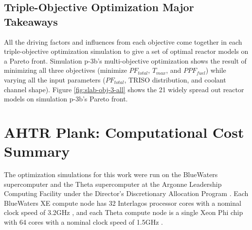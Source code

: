 \subsection{Triple-Objective Optimization Major Takeaways}
All the driving factors and influences from each objective come together in 
each triple-objective optimization simulation to give a set of optimal reactor models 
on a Pareto front. 
Simulation p-3b's multi-objective optimization shows the result of minimizing all 
three objectives (minimize $PF_{total}$, $T_{max}$, and $PPF_{fuel}$) while varying 
all the input parameters ($PF_{total}$, TRISO distribution, and coolant channel shape).
Figure \ref{fig:slab-obj-3-all} shows the 21 widely spread out reactor models on 
simulation p-3b's Pareto front. 

\section{AHTR Plank: Computational Cost Summary}
\label{sec:plank-compute-cost}
The optimization simulations for this work were run on the BlueWaters supercomputer 
\cite{ncsa_about_2017} and the Theta supercomputer at the Argonne Leadership Computing 
Facility under the Director's Discretionary Allocation Program 
\cite{noauthor_thetathetagpu_2022}. 
Each BlueWaters XE compute node has 32 Interlagos processor cores with a nominal 
clock speed of 3.2GHz \cite{ncsa_about_2017}, and each Theta compute node is a single 
Xeon Phi chip with 64 cores with a nominal clock speed of 1.5GHz 
\cite{noauthor_thetathetagpu_2022}.  

